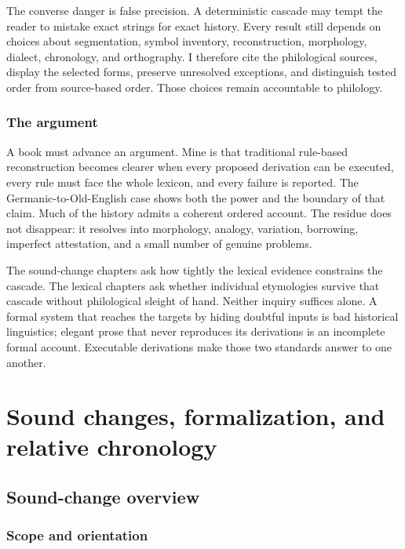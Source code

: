 \documentclass[
  british,
  a4paper,
  openany]{book}
\begin{document}
The converse danger is false precision. A deterministic cascade may
tempt the reader to mistake exact strings for exact history. Every
result still depends on choices about segmentation, symbol inventory,
reconstruction, morphology, dialect, chronology, and orthography. I
therefore cite the philological sources, display the selected forms,
preserve unresolved exceptions, and distinguish tested order from
source-based order. Those choices remain accountable to philology.

\section{The argument}\label{the-argument}

A book must advance an argument. Mine is that traditional rule-based
reconstruction becomes clearer when every proposed derivation can be
executed, every rule must face the whole lexicon, and every failure is
reported. The Germanic-to-Old-English case shows both the power and the
boundary of that claim. Much of the history admits a coherent ordered
account. The residue does not disappear: it resolves into morphology,
analogy, variation, borrowing, imperfect attestation, and a small number
of genuine problems.

The sound-change chapters ask how tightly the lexical evidence
constrains the cascade. The lexical chapters ask whether individual
etymologies survive that cascade without philological sleight of hand.
Neither inquiry suffices alone. A formal system that reaches the targets
by hiding doubtful inputs is bad historical linguistics; elegant prose
that never reproduces its derivations is an incomplete formal account.
Executable derivations make those two standards answer to one another.

\part{Sound changes, formalization, and relative chronology}

\chapter*{Sound-change overview}\label{sound-change-overview}

\section*{Scope and orientation}\label{scope-and-orientation}
\end{document}

